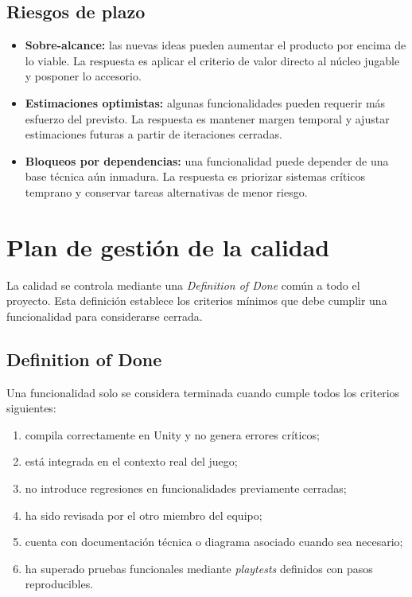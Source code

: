 \subsection{Riesgos de plazo}
\begin{itemize}
    \item \textbf{Sobre-alcance:} las nuevas ideas pueden aumentar el producto por encima de
    lo viable. La respuesta es aplicar el criterio de valor directo al núcleo jugable y
    posponer lo accesorio.
    \item \textbf{Estimaciones optimistas:} algunas funcionalidades pueden requerir más
    esfuerzo del previsto. La respuesta es mantener margen temporal y ajustar estimaciones
    futuras a partir de iteraciones cerradas.
    \item \textbf{Bloqueos por dependencias:} una funcionalidad puede depender de una base
    técnica aún inmadura. La respuesta es priorizar sistemas críticos temprano y conservar
    tareas alternativas de menor riesgo.
\end{itemize}

\section{Plan de gestión de la calidad}
La calidad se controla mediante una \textit{Definition of Done} común a todo el proyecto.
Esta definición establece los criterios mínimos que debe cumplir una funcionalidad para
considerarse cerrada.

\subsection{Definition of Done}
Una funcionalidad solo se considera terminada cuando cumple todos los criterios siguientes:

\begin{enumerate}
    \item compila correctamente en Unity y no genera errores críticos;
    \item está integrada en el contexto real del juego;
    \item no introduce regresiones en funcionalidades previamente cerradas;
    \item ha sido revisada por el otro miembro del equipo;
    \item cuenta con documentación técnica o diagrama asociado cuando sea necesario;
    \item ha superado pruebas funcionales mediante \textit{playtests} definidos con pasos
    reproducibles.
\end{enumerate}

